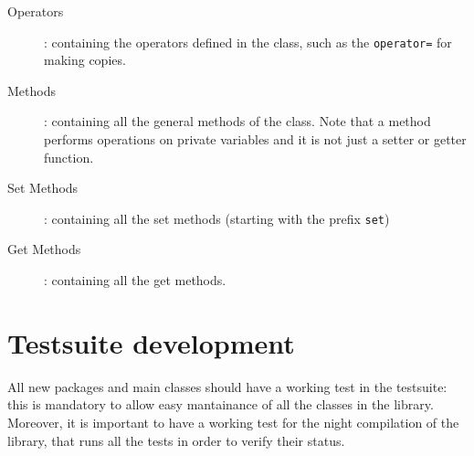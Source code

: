 \documentclass[a4paper]{article}
\begin{document}
\begin{itemize}
\begin{description}
      \item[Operators]: containing the operators defined in the class, such as
      the \texttt{operator=} for making copies.
      \item[Methods]: containing all the general methods of the class. Note that
      a method performs operations on private variables and it is
      not just a setter or getter function.
      \item[Set Methods]: containing all the set methods (starting with the
      prefix \texttt{set})
      \item[Get Methods]: containing all the get methods.
  \end{description}
\end{itemize}

\newpage
\section{Testsuite development} \label{testsuite}
All new packages and main classes should have a working test in the testsuite:
this is mandatory to allow easy mantainance of all the classes in the
library. Moreover, it is important to have a working test for the night
compilation of the library, that runs all the tests in order to verify their
status.
\end{document}
